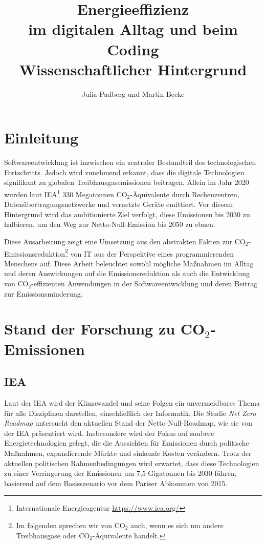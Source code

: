 \documentclass{article}
\title{Energieeffizienz\\im digitalen Alltag und beim Coding\\[2mm]Wissenschaftlicher Hintergrund}
\author{Julia Padberg und Martin Becke}
\date{\dokumentdatum}
\begin{document}
\maketitle
\tableofcontents

\section{Einleitung}
Softwareentwicklung ist inzwischen ein zentraler Bestandteil des technologischen Fortschritts. Jedoch wird zunehmend erkannt, dass die digitale Technologien signifikant zu globalen Treibhausgasemissionen beitragen. Allein im Jahr 2020  wurden laut IEA\footnote{%
	               Internationale Energieagentur \href{https://www.iea.org/}{https://www.iea.org/}} 
330 Megatonnen CO$_2$-Äquivalente\cite{iea_digitalisation_tracking} durch Rechenzentren, Datenübertragungsnetzwerke und vernetzte Geräte emittiert. Vor diesem Hintergrund wird das ambitionierte Ziel verfolgt, diese Emissionen bis 2030 zu halbieren, um den Weg zur Netto-Null-Emission bis 2050 zu ebnen.

Diese Ausarbeitung zeigt eine Umsetzung aus den abstrakten Fakten zur CO$_2$-Emissionsreduktion\footnote{%
          Im folgenden sprechen wir von CO$_2$ auch, wenn es sich um andere Treibhausgase 
					oder  CO$_2$-Äquivalente handelt.}
von IT aus der Perspektive eines programmierenden Menschens auf. 
Diese Arbeit beleuchtet sowohl mögliche Maßnahmen im Alltag  und deren Auswirkungen auf die Emissionsreduktion als auch die Entwicklung von CO$_2$-effizienten Anwendungen in der Softwareentwicklung und deren Beitrag zur Emissionsminderung.

\section{Stand der Forschung zu CO$_2$-Emissionen}
 \subsection*{IEA}
  Laut der IEA wird der Klimawandel und seine Folgen ein unvermeidbares Thema für alle Disziplinen darstellen, einschließlich der Informatik. Die Studie \textit{Net Zero Roadmap} \cite{iea_net_zero2023} untersucht den aktuellen Stand der Netto-Null-Roadmap, wie sie von der IEA präsentiert wird. Insbesondere wird der Fokus auf saubere Energietechnologien gelegt, die die Aussichten für Emissionen durch politische Maßnahmen, expandierende Märkte und sinkende Kosten verändern. Trotz der aktuellen politischen Rahmenbedingungen wird erwartet, dass diese Technologien zu einer Verringerung der Emissionen um 7,5 Gigatonnen bis 2030 führen, basierend auf dem Basisszenario vor dem Pariser Abkommen von 2015.
	
\end{document}
